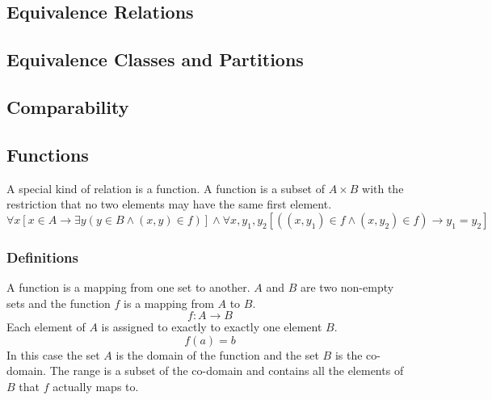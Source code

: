 \documentclass[a4paper, 10pt]{article}
\begin{document}
\subsection{Equivalence Relations}
\subsection{Equivalence Classes and Partitions}
\subsection{Comparability}

\subsection{Functions}
A special kind of relation is a function. A function is a subset of \(A\times B\) with the restriction that no two elements may have the same first element.
\[ \forall x\left[x\in A\rightarrow \exists y\left(y\in B\land (x,y)\in f\right)\right] \land \forall x,y_1,y_2\left[\left((x,y_1)\in f\land(x,y_2)\in f\right)\rightarrow y_1 = y_2 \right] \]
\subsubsection{Definitions}
A function is a mapping from one set to another. \(A\) and \(B\) are two non-empty sets and the function \(f\) is a mapping from \(A\) to \(B\).
\[f:A\rightarrow B\]
Each element of \(A\) is assigned to exactly to exactly one element \(B\).
\[f(a) = b\]
In this case the set \(A\) is the domain of the function and the set \(B\) is the co-domain. The range is a subset of the co-domain and contains all the elements of \(B\) that \(f\) actually maps to.

\begin{center}
\end{center}
\end{document}
